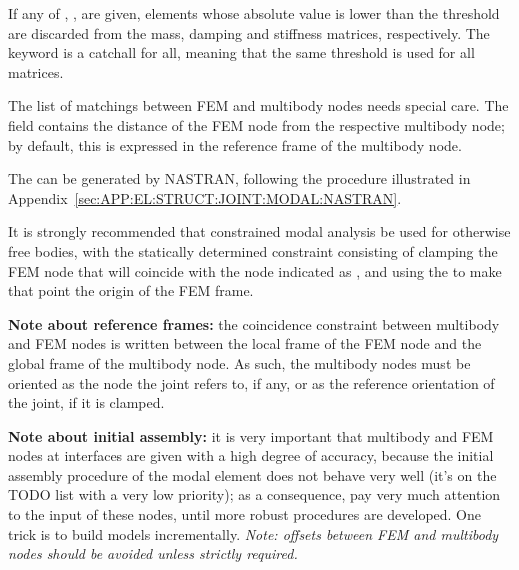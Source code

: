 If any of , ,  are given,
elements whose absolute value is lower than the threshold
are discarded from the mass, damping and stiffness matrices, respectively.
The keyword  is a catchall for all,
meaning that the same threshold is used for all matrices.

The list of matchings between FEM and multibody nodes needs
special care.
The  field contains the distance
of the FEM node from the respective multibody node; by default,
this is expressed in the reference frame of the multibody node.

The  can be generated by NASTRAN, 
following the procedure illustrated
in Appendix~\ref{sec:APP:EL:STRUCT:JOINT:MODAL:NASTRAN}.

It is strongly recommended that constrained modal analysis
be used for otherwise free bodies, with the statically 
determined constraint consisting of clamping the FEM node 
that will coincide with the node indicated as ,
and using the  to make that point the origin
of the FEM frame.

\textbf{Note about reference frames:} the coincidence constraint between 
multibody and FEM nodes is written between the local frame 
of the FEM node and the global frame of the multibody node.
As such, the multibody nodes must be oriented as the 
node the  joint refers to, if any, or as the reference
orientation of the  joint, if it is clamped.

\textbf{Note about initial assembly:} it is very important that multibody 
and FEM nodes at interfaces are given with a high degree of accuracy,
because the initial assembly procedure of the modal element
does not behave very well (it's on the TODO list with a very low
priority); as a consequence, pay very much attention to the input
of these nodes, until more robust procedures are developed.
One trick is to build models incrementally.
\emph{Note: offsets between FEM and multibody nodes 
should be avoided unless strictly required.}

